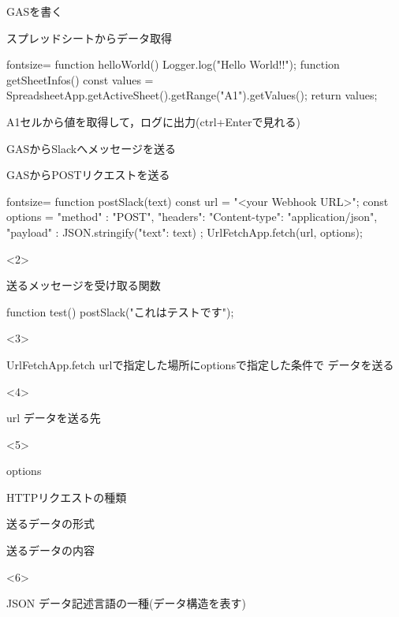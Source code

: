 \documentclass[dvipdfmx,xcolor={svgnames}]{beamer}
\begin{document}
  \begin{frame}[fragile]{GASを書く}
    \begin{exampleblock}{スプレッドシートからデータ取得}
      \begin{GAS*}{fontsize=\scriptsize}
function helloWorld(){
  Logger.log("Hello World!!");
}
function getSheetInfos(){
  const values = SpreadsheetApp.getActiveSheet().getRange("A1").getValues();
  return values;
}
      \end{GAS*}
    \end{exampleblock}
    \LARGE A1セルから値を取得して，ログに出力(ctrl+Enterで見れる)
  \end{frame}
  \begin{frame}[fragile]{GASからSlackへメッセージを送る}
    \begin{exampleblock}{GASからPOSTリクエストを送る}
      \begin{GAS*}{fontsize=\small}
function postSlack(text){
  const url = "<your Webhook URL>";
  const options = {
    "method" : "POST",
    "headers": {"Content-type": "application/json"},
    "payload" : JSON.stringify({"text": text})
  };
  UrlFetchApp.fetch(url, options);
}
      \end{GAS*}
    \end{exampleblock}
    \begin{onlyenv}<2>
      \begin{exampleblock}{送るメッセージを受け取る関数}
        \begin{GAS}
function test(){
  postSlack("これはテストです");
}
        \end{GAS}
      \end{exampleblock}
    \end{onlyenv}
    \begin{onlyenv}<3>
      \begin{block}{UrlFetchApp.fetch}
        urlで指定した場所にoptionsで指定した条件で
        データを送る
      \end{block}
    \end{onlyenv}
    \begin{onlyenv}<4>
      \begin{block}{url}
        データを送る先
      \end{block}
    \end{onlyenv}
    \begin{onlyenv}<5>
      \begin{block}{options}
        \begin{description}\normalsize
          \item[method] HTTPリクエストの種類
          \item[headers] 送るデータの形式
          \item[payload] 送るデータの内容
        \end{description}
      \end{block}
    \end{onlyenv}
    \begin{onlyenv}<6>
      \begin{block}{JSON}
        データ記述言語の一種(データ構造を表す)
      \end{block}
    \end{onlyenv}
  \end{frame}
\end{document}
